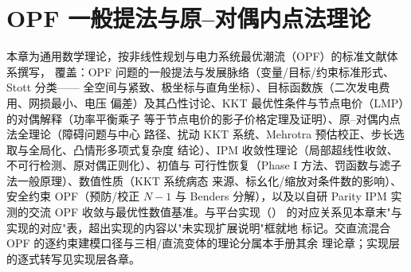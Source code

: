 
\section{OPF 一般提法与原--对偶内点法理论}\label{sec:opf-th-gen}

\begin{theorynote}
本章为通用数学理论，按非线性规划与电力系统最优潮流（OPF）的标准文献体系撰写，
覆盖：OPF 问题的一般提法与发展脉络（变量/目标/约束标准形式、Stott 分类——
全空间与紧致、极坐标与直角坐标）、目标函数族（二次发电费用、网损最小、电压
偏差）及其凸性讨论、KKT 最优性条件与节点电价（LMP）的对偶解释（功率平衡乘子
等于节点电价的影子价格定理及证明）、原--对偶内点法全理论（障碍问题与中心
路径、扰动 KKT 系统、Mehrotra 预估校正、步长选取与全局化、凸情形多项式复杂度
结论）、IPM 收敛性理论（局部超线性收敛、不可行检测、原对偶正则化）、初值与
可行性恢复（Phase I 方法、罚函数与滤子法一般原理）、数值性质（KKT 系统病态
来源、标幺化/缩放对条件数的影响）、安全约束 OPF（预防/校正 $N\!-\!1$ 与 Benders
分解），以及以自研 Parity IPM 实测的交流 OPF 收敛与最优性数值基准。与平台实现（）
的对应关系见本章末"与实现的对应"表，超出实现的内容以"未实现扩展说明"框就地
标记。交直流混合 OPF 的逐约束建模口径与三相/直流变体的理论分属本手册其余
理论章；实现层的逐式转写见实现层各章。
\end{theorynote}

